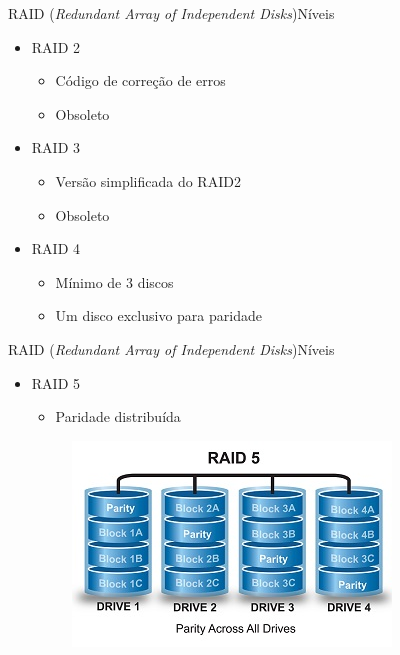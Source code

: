 \documentclass[aspectratio=169,
				xcolor=table]{beamer}
\begin{document}
	\begin{frame}[t]{RAID (\textit{Redundant Array of Independent Disks})}{Níveis}
		\begin{itemize}
			\item RAID 2
			\begin{itemize}
				\item Código de correção de erros
				\item Obsoleto
			\end{itemize}	
			\vspace{1em}
			\item RAID 3
			\begin{itemize}
				\item Versão simplificada do RAID2
				\item Obsoleto
			\end{itemize}	
			\vspace{1em}	
			\item RAID 4
			\begin{itemize}
				\item Mínimo de 3 discos
				\item Um disco exclusivo para paridade
			\end{itemize}	
		\end{itemize}
	\end{frame}
	
	\begin{frame}[t]{RAID (\textit{Redundant Array of Independent Disks})}{Níveis}
		\begin{itemize}
			\item RAID 5
			\begin{itemize}
				\item Paridade distribuída
			\end{itemize}
			
					\begin{figure}
		\centering
		\includegraphics[height=0.7\textheight, keepaspectratio]{../figs/cap08/raid5}
		\end{figure}
		\end{itemize}
		
	\end{frame}	
	
\end{document}

